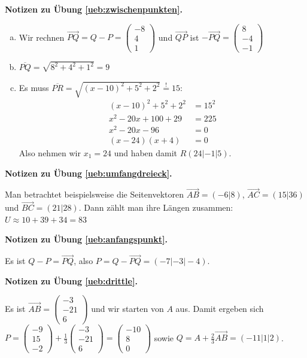 \documentclass[%
11pt,%
twoside,%
titlepage,%
german,%
headsepline%
]{scrartcl}
\theoremstyle{definition}
\theoremstyle{plain}
\newcommand{\concatueb}[1]{ueb:#1}%
\newcommand{\concatlsg}[1]{lsg:#1}%
\newenvironment{lsg}[1]{%
    \par\noindent\textbf{Notizen zu Übung \ref{\concatueb{#1}}.}%
    \label{\concatlsg{#1}}
}{%
    \par%
}
\begin{document}
\begin{lsg}{zwischenpunkten}
    \begin{enumerate}[a)]
        \item Wir rechnen $\vec{PQ}=Q-P=\begin{pmatrix}
            -8\\4\\1
        \end{pmatrix}$ und $\vec{QP}$ ist $-\vec{PQ}=\begin{pmatrix}
            8\\-4\\-1
        \end{pmatrix}$
        \item $\overline{PQ}=\sqrt{8^2+4^2+1^2}=9$
        \item Es muss $\overline{PR}=\sqrt{(x-10)^2+5^2+2^2}\stackrel{!}{=}15$:
        \begin{align*}
            (x-10)^2+5^2+2^2 &= 15^2\\
            x^2-20x+100+29 &= 225\\
            x^2-20x-96 &= 0\\
            (x-24)(x+4) &= 0
        \end{align*}
        Also nehmen wir $x_1=24$ und haben damit $R(24|-1|5)$.
    \end{enumerate}
\end{lsg}
\begin{lsg}{umfangdreieck}
    Man betrachtet beispielsweise die Seitenvektoren $\vec{AB}=(-6|8)$, $\vec{AC}=(15|36)$ und $\vec{BC}=(21|28)$. Dann zählt man ihre Längen zusammen: $U\approx10+39+34=83$
\end{lsg}
\begin{lsg}{anfangspunkt}
    Es ist $Q-P=\vec{PQ}$, also $P=Q-\vec{PQ}=(-7|-3|-4)$.
\end{lsg}
\begin{lsg}{drittle}
    Es ist $\vec{AB}=\begin{pmatrix}
        -3\\-21\\6
    \end{pmatrix}$ und wir starten von $A$ aus. Damit ergeben sich $P=\begin{pmatrix}
        -9\\15\\-2
    \end{pmatrix}+\frac{1}{3}\begin{pmatrix}
        -3\\-21\\6
    \end{pmatrix}=\begin{pmatrix}
        -10\\8\\0
    \end{pmatrix}$ sowie $Q=A+\frac{2}{3}\vec{AB}=(-11|1|2)$. 
\end{lsg}
\end{document}
